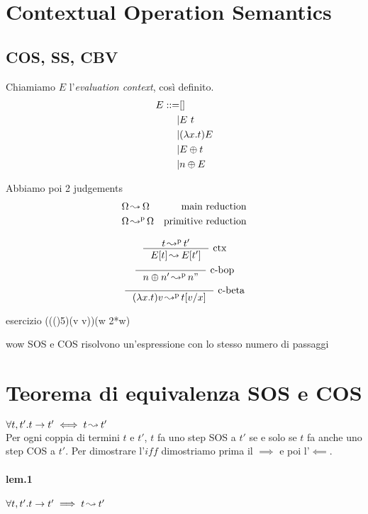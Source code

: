 \documentclass{article}
\begin{document}
\section{Contextual Operation Semantics}
\subsection{COS, SS, CBV}
Chiamiamo $E$ l'\textit{evaluation context}, così definito.
\begin{align*}
E ::= &[] \\
|& E\ t \\
|& (\lambda x.t)E \\
|& E \oplus t \\
|& n \oplus E 
\end{align*}

Abbiamo poi 2 judgements
\begin{align*}
    \Omega &\operatorname{ \leadsto^{} } \Omega & \text{main reduction} \\
    \Omega &\operatorname{ \leadsto^{p} } \Omega & \text{primitive reduction}
\end{align*}

\begin{gather*}
    \rl{t\credp t'}{E[t]\cred E[t']}{ctx} \\
    \rl{}{n\bop n' \credp n"}{c-bop} \\
    \rl{}{(\lam{x}{t})v \credp t[v/x]}{c-beta}
\end{gather*}

\begin{callout}{esercizio}
((()5)(\lam v v))(\lam w {2*w})
\end{callout}

\begin{callout}{wow}
SOS e COS risolvono un'espressione con lo stesso numero di passaggi
\end{callout}

\section{Teorema di equivalenza SOS e COS}
$\forall t,t'.t\to t' \iff t\operatorname{ \leadsto^{} } t'$ \\
Per ogni coppia di termini $t$ e $t'$, $t$ fa uno step SOS a $t'$ se e solo se $t$ fa anche uno step COS a $t'$.
Per dimostrare l'$iff$ dimostriamo prima il $\implies$ e poi l'$\impliedby$.

\paragraph{lem.1} $\forall t,t'.t\to t' \implies t\operatorname{ \leadsto^{} } t'$
\end{document}
